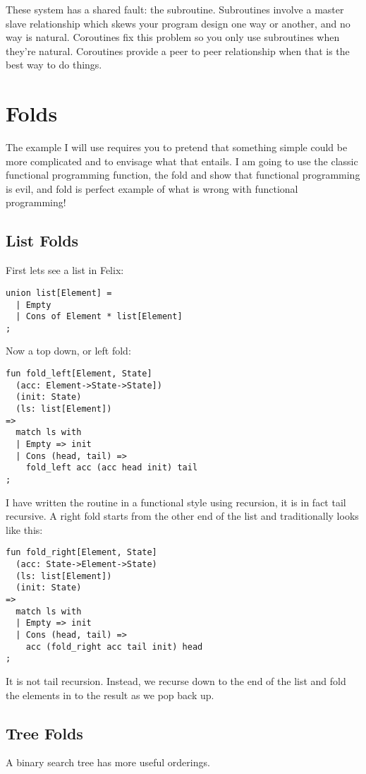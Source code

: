 \documentclass[oneside]{book}
\begin{document}
These system has a shared fault: the subroutine. Subroutines involve
a master slave relationship which skews your program design one
way or another, and no way is natural. Coroutines fix this problem
so you only use subroutines when they're natural. Coroutines provide
a peer to peer relationship when that is the best way to do things.

\section{Folds}
The example I will use requires you to pretend that something simple
could be more complicated and to envisage what that entails. 
I am going to use the classic functional programming function,
the fold and show that functional programming is evil, and fold is 
perfect example of what is wrong with functional programming!

\subsection{List Folds}
First lets see a list in Felix:

\begin{verbatim}
union list[Element] =
  | Empty 
  | Cons of Element * list[Element]
;
\end{verbatim}

Now a top down, or left fold:

\begin{verbatim}
fun fold_left[Element, State] 
  (acc: Element->State->State])
  (init: State)
  (ls: list[Element])
=>
  match ls with
  | Empty => init
  | Cons (head, tail) =>
    fold_left acc (acc head init) tail
;
\end{verbatim}

I have written the routine in a functional style using recursion,
it is in fact tail recursive. A right fold starts from the other
end of the list and traditionally looks like this:

\begin{verbatim}
fun fold_right[Element, State] 
  (acc: State->Element->State)
  (ls: list[Element])
  (init: State)
=>
  match ls with
  | Empty => init
  | Cons (head, tail) =>
    acc (fold_right acc tail init) head
;
\end{verbatim}

It is not tail recursion. Instead, we recurse down to the end of
the list and fold the elements in to the result as we pop back up.

\subsection{Tree Folds}
A binary search tree has more useful orderings. 
\end{document}
